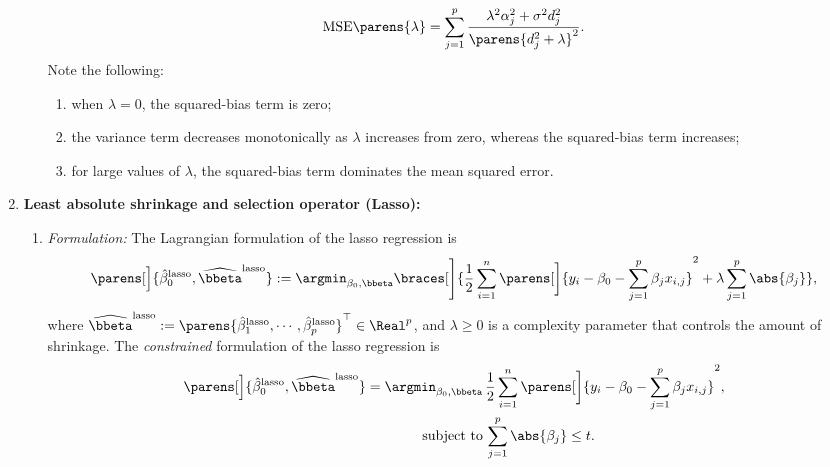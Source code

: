\documentclass[12pt]{article}
\begin{document}
\begin{enumerate}[label=\textbf{\arabic*.}]
\begin{enumerate}
\begin{align*}
			\mathrm{MSE} \parens{\lambda} = \sum_{j=1}^p \frac{\lambda^2 \alpha_j^2 + \sigma^2 d_j^2}{\parens{d_j^2 + \lambda}^2}. 
		\end{align*}
		Note the following: 
		\begin{enumerate}
			\item when $\lambda = 0$, the squared-bias term is zero; 
			\item the variance term decreases monotonically as $\lambda$ increases from zero, whereas the squared-bias term increases; 
			\item for large values of $\lambda$, the squared-bias term dominates the mean squared error. 
		\end{enumerate}
		
	\end{enumerate} 
	
	\item \textbf{Least absolute shrinkage and selection operator (Lasso):} 
	\begin{enumerate}
		\item \textit{Formulation:} The Lagrangian formulation of the lasso regression is 
		\begin{align}\label{lasso.lag}
			\parens[\Big]{\hat{\beta}_{0}^{\mathrm{lasso}}, \widehat{\bbeta}^{\mathrm{lasso}}} := \argmin_{\beta_0, \bbeta} \braces[\Bigg]{\frac{1}{2} \sum_{i=1}^n \parens[\bigg]{y_i - \beta_0 - \sum_{j=1}^p \beta_j x_{i,j}}^2 + \lambda \sum_{j=1}^p \abs{\beta_j}}, 
		\end{align}
		where $\widehat{\bbeta}^{\mathrm{lasso}} := \parens{\hat{\beta}_{1}^{\mathrm{lasso}}, \cdots, \hat{\beta}_{p}^{\mathrm{lasso}}}^\top \in \Real^p$, and $\lambda \ge 0$ is a complexity parameter that controls the amount of shrinkage. The \textit{constrained} formulation of the lasso regression is 	
		\begin{equation}\label{lasso.con}
			\begin{aligned}
				\parens[\Big]{\hat{\beta}_{0}^{\mathrm{lasso}}, \widehat{\bbeta}^{\mathrm{lasso}}} = \argmin_{\beta_0, \bbeta} & \, \frac{1}{2} \sum_{i=1}^n \parens[\bigg]{y_i - \beta_0 - \sum_{j=1}^p \beta_j x_{i,j}}^2, \\
				\text{subject to} & \, \sum_{j=1}^p \abs{\beta_j} \le t. 
			\end{aligned}
		\end{equation}
		

\end{enumerate}
\end{enumerate}
\end{document}
